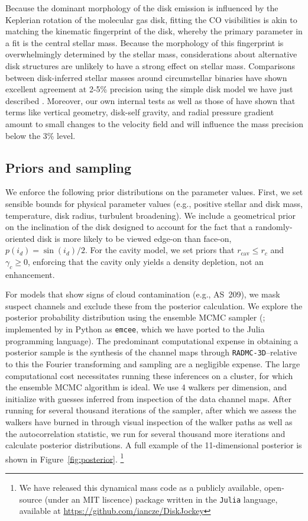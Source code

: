 \documentclass{aastex6}
\begin{document}
Because the dominant morphology of the disk emission is influenced by the Keplerian rotation of the molecular gas disk, fitting the CO visibilities is akin to matching the kinematic fingerprint of the disk, whereby the primary parameter in a fit is the central stellar mass. Because the morphology of this fingerprint is overwhelmingly determined by the stellar mass, considerations about alternative disk structures are unlikely to have a strong effect on stellar mass. Comparisons between disk-inferred stellar masses around circumstellar binaries have shown excellent agreement at 2-5\% precision using the simple disk model we have just described \citep{rosenfeld12b,czekala15a,czekala16}. Moreover, our own internal tests as well as those of \citet{rosenfeld13a} have shown that terms like vertical geometry, disk-self gravity, and radial pressure gradient amount to small changes to the velocity field and will influence the mass precision below the 3\% level.

\subsection{Priors and sampling}
We enforce the following prior distributions on the parameter values. First, we set sensible bounds for physical parameter values (e.g., positive stellar and disk mass, temperature, disk radius, turbulent broadening). We include a geometrical prior on the inclination of the disk designed to account for the fact that a randomly-oriented disk is more likely to be viewed edge-on than face-on, $p(i_d) =  \sin(i_d)/2$. For the cavity model, we set priors that $r_\mathrm{cav} \leq r_c$ and $\gamma_c \geq 0$, enforcing that the cavity only yields a density depletion, not an enhancement.

For models that show signs of cloud contamination (e.g., AS~209), we mask suspect channels and exclude these from the posterior calculation. We explore the posterior probability distribution using the ensemble MCMC sampler (\citet{goodman10}; implemented by \citet{foreman-mackey13} in Python as \texttt{emcee}, which we have ported to the Julia programming language). The predominant computational expense in obtaining a posterior sample is the synthesis of the channel maps through \texttt{RADMC-3D}--relative to this the Fourier transforming and sampling are a negligible expense. The large computational cost necessitates running these inferences on a cluster, for which the ensemble MCMC algorithm is ideal. We use 4 walkers per dimension, and initialize with guesses inferred from inspection of the data channel maps. After running for several thousand iterations of the sampler, after which we assess the walkers have burned in through visual inspection of the walker paths as well as the autocorrelation statistic, we run for several thousand more iterations and calculate posterior distributions. A full example of the 11-dimensional posterior is shown in Figure~\ref{fig:posterior}. \footnote{We have released this dynamical mass code as a publicly available, open-source (under an MIT liscence) package written in the \texttt{Julia} language, available at \url{https://github.com/iancze/DiskJockey}}
\end{document}
